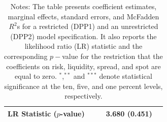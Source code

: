 \documentclass[11pt]{article}
\begin{document}
\begin{table}[!htbp]
\begin{center}
{\begin{tabular}{l c  c c c }
LR Statistic ($p$-value)       &             &             & 3.680 (0.451)    & \\
\bottomrule
\end{tabular}
}
\caption*{\scriptsize Notes: The table presents coefficient estimates, marginal effects, standard errors, and McFadden $R^2$s for a restricted (DPP1) and an unrestricted (DPP2) model specification. It also reports the likelihood ratio (LR) statistic and the corresponding $p-$value for the restriction that the coefficients on risk, liquidity, spread, and spot are equal to zero. $^{*}$,$^{**}$ and $^{***}$ denote statistical significance at the ten, five, and one percent levels, respectively.}
\label{tab:probit}
\end{center}
\end{table}
\end{document}
